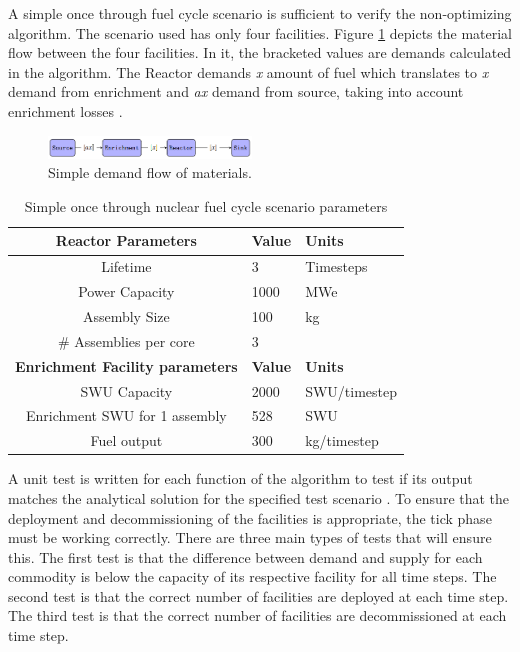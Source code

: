 \documentclass{anstrans}
\begin{document}
A simple once through fuel cycle scenario is sufficient to verify the 
non-optimizing algorithm. The scenario used has only four facilities. Figure 
\ref{fig:materialflow} depicts the material flow between the four facilities.   
In it, the bracketed values are demands calculated in the algorithm. The 
Reactor demands \textit{x} amount of fuel which translates to \textit{x} demand 
from enrichment and \textit{ax} demand from source, taking into account 
enrichment losses \cite{bae_numerical_2018}.

\begin{figure}[ht] %
	\centering
	\includegraphics[width=0.48\textwidth]{materialflow}
\caption{Simple demand flow of materials.}
	\label{fig:materialflow}
\end{figure}

\begin{table}[h]
	\centering
	\begin{tabularx}{0.5\textwidth}{cff}
		\hline
		\textbf{Reactor Parameters} & \textbf{Value} & \textbf{Units} \\
		\hline
		Lifetime & 3 & Timesteps \\ 
		Power Capacity & 1000 & MWe \\
		Assembly Size & 100 & kg \\
		\# Assemblies per core & 3 & \\
		\hline
		\textbf{Enrichment Facility parameters} & \textbf{Value} & \textbf{Units} \\
		\hline 
		SWU Capacity & 2000 & SWU/timestep \\
		Enrichment SWU for 1 assembly & 528 & SWU \\
		Fuel output & 300 & kg/timestep \\
		\hline
	\end{tabularx}
	\caption {Simple once through nuclear fuel cycle scenario parameters \cite{bae_numerical_2018}}
	\label{tab:parameters}
\end{table}


A unit test is written for each function of the algorithm to test if its output matches the analytical solution for the specified test scenario \cite{bae_numerical_2018}. To ensure that the deployment and decommissioning of the facilities is appropriate, the tick phase must be working correctly. There are three main types of tests that will ensure this. The first test is that the difference between demand and supply for each commodity is below the capacity of its respective facility for all time steps. The second test is that the correct number of facilities are deployed at each time step. The third test is that the correct number of facilities are decommissioned at each time step.  
\end{document}
